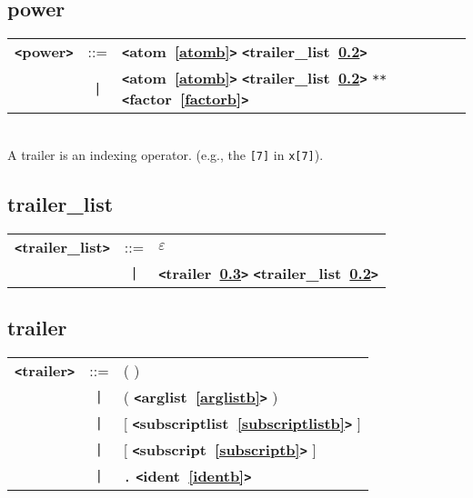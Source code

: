 \documentclass[12pt]{article}
\begin{document}
\subsection{power}
\label{powerb}
\begin{tabular}{lcl}
{\bf \verb+<+power\verb+>+} & ::=  & {\bf \verb+<+atom~\ref{atomb}\verb+>+}  {\bf \verb+<+trailer\_list~\ref{trailerzzzlistb}\verb+>+}  \\
 & \verb+|+  & {\bf \verb+<+atom~\ref{atomb}\verb+>+}  {\bf \verb+<+trailer\_list~\ref{trailerzzzlistb}\verb+>+}  \verb|**| {\bf \verb+<+factor~\ref{factorb}\verb+>+}  \\
\end{tabular} \\

A trailer is an indexing operator.  (e.g., the \verb|[7]| in \verb|x[7]|).

\subsection{trailer\_list}
\label{trailerzzzlistb}
\begin{tabular}{lcl}
{\bf \verb+<+trailer\_list\verb+>+} & ::=  & $\varepsilon$ \\
 & \verb+|+  & {\bf \verb+<+trailer~\ref{trailerb}\verb+>+}  {\bf \verb+<+trailer\_list~\ref{trailerzzzlistb}\verb+>+}  \\
\end{tabular}

\subsection{trailer}
\label{trailerb}
\begin{tabular}{lcl}
{\bf \verb+<+trailer\verb+>+} & ::=  & ( ) \\
 & \verb+|+  & ( {\bf \verb+<+arglist~\ref{arglistb}\verb+>+}  ) \\
 & \verb+|+  & [ {\bf \verb+<+subscriptlist~\ref{subscriptlistb}\verb+>+}  ] \\
 & \verb+|+  & [ {\bf \verb+<+subscript~\ref{subscriptb}\verb+>+}  ] \\
 & \verb+|+  & \verb|.| {\bf \verb+<+ident~\ref{identb}\verb+>+}  \\
\end{tabular}

\end{document}
